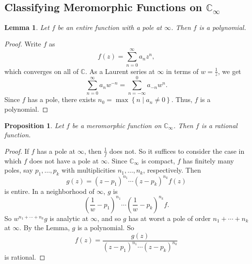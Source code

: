\documentclass[12pt]{article}
\newcommand{\cx}{\mathbb{C}}
\newcommand\setb[1]{\left \{ #1 \right \}}
\newtheorem{lemma}[theorem]{Lemma}
\newtheorem{proposition}[theorem]{Proposition}
\theoremstyle{definition}
\theoremstyle{remark}
\begin{document}
\subsection{Classifying Meromorphic Functions on \texorpdfstring{$\cx_{\infty}$}{Coo}}
\begin{lemma}
    Let $f$ be an entire function with a pole at $\infty$. Then $f$ is a polynomial.
\end{lemma}
\begin{proof}
    Write $f$ as 
    \begin{equation}
        f(z) = \sum\limits_{n = 0}^{\infty} a_n z^n,
    \end{equation}
    which converges on all of $\cx$. As a Laurent series at $\infty$ in terms of $w = \frac{1}{z}$, we get 
    \begin{equation}
        \sum\limits_{n = 0}^{\infty} a_n w^{-n} = \sum\limits_{n = -\infty}^{0} a_{-n} w^n.
    \end{equation}
    Since $f$ has a pole, there exists $n_0 = \max \setb{n \mid a_n \neq 0}$. Thus, $f$ is a polynomial.
\end{proof}
\begin{proposition}
    Let $f$ be a meromorphic function on $\cx_{\infty}$. Then $f$ is a rational function.
\end{proposition}
\begin{proof}
    If $f$ has a pole at $\infty$, then $\frac{1}{f}$ does not. So it suffices to consider the case in which $f$ does not have a pole at $\infty$. Since $\cx_{\infty}$ is compact, $f$ has finitely many poles, say $p_1 , \dotsc, p_k$ with multiplicities $n_1 , \dotsc, n_k$, respectively. Then 
    \begin{equation}
        g(z) = (z - p_1)^{n_1} \dotsm (z - p_k)^{n_k} f(z)
    \end{equation}
    is entire. In a neighborhood of $\infty$, $g$ is 
    \begin{equation}
        \left( \frac{1}{w} - p_1 \right)^{n_1} \dotsm \left( \frac{1}{w} - p_k \right)^{n_k} f.
    \end{equation}
    So $w^{n_1 + \dotsb + n_k} g$ is analytic at $\infty$, and so $g$ has at worst a pole of order $n_1 + \dotsb + n_k$ at $\infty$. By the Lemma, $g$ is a polynomial. So
    \begin{equation}
        f(z) = \frac{g(z)}{(z - p_1)^{n_1} \dotsm (z - p_k)^{n_k}}
    \end{equation}
    is rational.
\end{proof}
\end{document}
